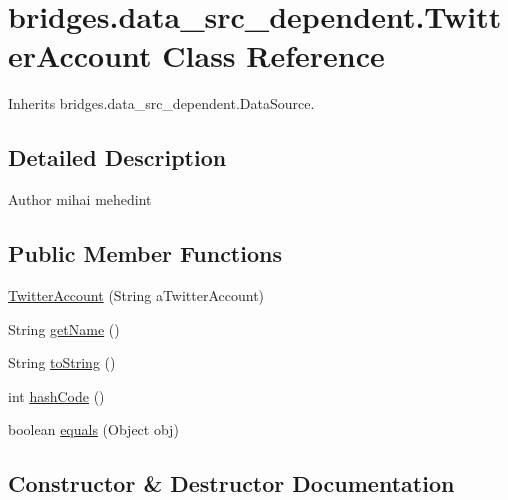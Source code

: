 \hypertarget{classbridges_1_1data__src__dependent_1_1_twitter_account}{}\section{bridges.\+data\+\_\+src\+\_\+dependent.\+Twitter\+Account Class Reference}
\label{classbridges_1_1data__src__dependent_1_1_twitter_account}


Inherits bridges.\+data\+\_\+src\+\_\+dependent.\+Data\+Source.



\subsection{Detailed Description}
\begin{DoxyAuthor}{Author}
mihai mehedint 
\end{DoxyAuthor}
\subsection*{Public Member Functions}
\begin{DoxyCompactItemize}
\item 
\hyperlink{classbridges_1_1data__src__dependent_1_1_twitter_account_a725febd1fcbbee710fd638d6b4a9db62}{Twitter\+Account} (String a\+Twitter\+Account)
\item 
String \hyperlink{classbridges_1_1data__src__dependent_1_1_twitter_account_a92c536bd6a65c51d84a77d772775e20c}{get\+Name} ()
\item 
String \hyperlink{classbridges_1_1data__src__dependent_1_1_twitter_account_af4dd5dfe1a1556fa57f917fb24d8d6f2}{to\+String} ()
\item 
int \hyperlink{classbridges_1_1data__src__dependent_1_1_twitter_account_a2f89f6f336b1bd39f0cf3aa444c76885}{hash\+Code} ()
\item 
boolean \hyperlink{classbridges_1_1data__src__dependent_1_1_twitter_account_a2bddc8fe99b9096fe90968d805fa91e1}{equals} (Object obj)
\end{DoxyCompactItemize}


\subsection{Constructor \& Destructor Documentation}
\mbox{\label{classbridges_1_1data__src__dependent_1_1_twitter_account_a725febd1fcbbee710fd638d6b4a9db62}} 
